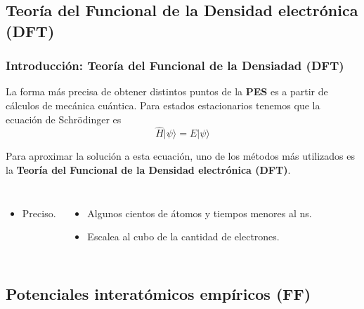 \documentclass[aspectratio=169]{beamer}
\let\oldtextbf\textbf
\renewcommand{\textbf}[1]{\textcolor{nordblue}{\oldtextbf{#1}}}
\begin{document}
    \subsection{Teoría del Funcional de la Densidad electrónica (DFT)}

	\begin{frame}
        \frametitle{Introducción: Teoría del Funcional de la Densiadad (DFT)}
        
        La forma más precisa de obtener distintos puntos de la \textbf{PES} 
        es a partir de cálculos de mecánica cuántica. Para estados estacionarios 
        tenemos que la ecuación de Schrödinger es 
        $$
        \hat{H} |\psi\rangle = E |\psi\rangle
        $$
        \pause

        Para aproximar la solución a esta ecuación, uno de los métodos más 
        utilizados es la \textbf{Teoría del Funcional de la Densidad electrónica 
        (DFT)}.

        \pause

        \begin{columns}
            \begin{itemize}
                \item Preciso.
            \end{itemize}

            \begin{itemize}
                \item Algunos cientos de átomos y tiempos menores al ns.
                \item Escalea al cubo de la cantidad de electrones.
            \end{itemize}
        \end{columns}
        
	\end{frame}
    
    \subsection{Potenciales interatómicos empíricos (FF)}
	
\end{document}
